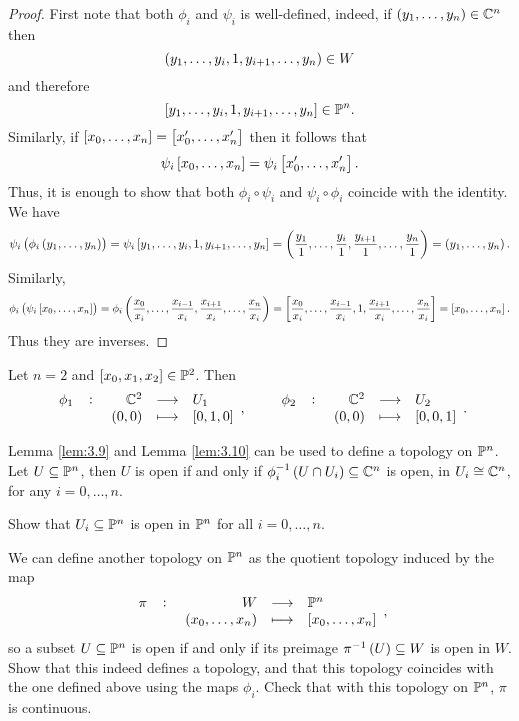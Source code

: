 \begin{proof}
First note that both $ \phi_i $ and $ \psi_i $ is well-defined, indeed, if $ \br{y_1, \dots, y_n} \in \C^n $ then
$$ \br{y_1, \dots, y_i, 1, y_{i + 1}, \dots, y_n} \in W $$
and therefore
$$ \sbr{y_1, \dots, y_i, 1, y_{i + 1}, \dots, y_n} \in \P^n. $$
Similarly, if $ \sbr{x_0, \dots, x_n} = \sbr{x_0', \dots, x_n'} $ then it follows that
$$ \psi_i\sbr{x_0, \dots, x_n} = \psi_i\sbr{x_0', \dots, x_n'}. $$
Thus, it is enough to show that both $ \phi_i \circ \psi_i $ and $ \psi_i \circ \phi_i $ coincide with the identity. We have
$$ \psi_i\br{\phi_i\br{y_1, \dots, y_n}} = \psi_i\sbr{y_1, \dots, y_i, 1, y_{i + 1}, \dots, y_n} = \br{\dfrac{y_1}{1}, \dots, \dfrac{y_i}{1}, \dfrac{y_{i + 1}}{1}, \dots, \dfrac{y_n}{1}} = \br{y_1, \dots, y_n}. $$
Similarly,
$$ \phi_i\br{\psi_i\sbr{x_0, \dots, x_n}} = \phi_i\br{\dfrac{x_0}{x_i}, \dots, \dfrac{x_{i - 1}}{x_i}, \dfrac{x_{i + 1}}{x_i}, \dots, \dfrac{x_n}{x_i}} = \sbr{\dfrac{x_0}{x_i}, \dots, \dfrac{x_{i - 1}}{x_i}, 1, \dfrac{x_{i + 1}}{x_i}, \dots, \dfrac{x_n}{x_i}} = \sbr{x_0, \dots, x_n}. $$
Thus they are inverses.
\end{proof}

\begin{example*}
Let $ n = 2 $ and $ \sbr{x_0, x_1, x_2} \in \P^2 $. Then
$$ \function[\phi_1]{\C^2}{U_1}{\br{0, 0}}{\sbr{0, 1, 0}}, \qquad \function[\phi_2]{\C^2}{U_2}{\br{0, 0}}{\sbr{0, 0, 1}}. $$
\end{example*}

Lemma \ref{lem:3.9} and Lemma \ref{lem:3.10} can be used to define a topology on $ \P^n $. Let $ U \subseteq \P^n $, then $ U $ is open if and only if $ \phi_i^{-1}\br{U \cap U_i} \subseteq \C^n $ is open, in $ U_i \cong \C^n $, for any $ i = 0, \dots, n $.

\begin{exercise}
Show that $ U_i \subseteq \P^n $ is open in $ \P^n $ for all $ i = 0, \dots, n $.
\end{exercise}

\begin{exercise}
\label{ex:11}
We can define another topology on $ \P^n $ as the quotient topology induced by the map
$$ \function[\pi]{W}{\P^n}{\br{x_0, \dots, x_n}}{\sbr{x_0, \dots, x_n}}, $$
so a subset $ U \subseteq \P^n $ is open if and only if its preimage $ \pi^{-1}\br{U} \subseteq W $ is open in $ W $. Show that this indeed defines a topology, and that this topology coincides with the one defined above using the maps $ \phi_i $. Check that with this topology on $ \P^n $, $ \pi $ is continuous.
\end{exercise}

